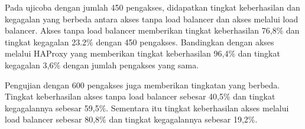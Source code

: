 	Pada ujicoba dengan jumlah 450 pengakses, didapatkan tingkat keberhasilan dan kegagalan yang berbeda antara akses tanpa load balancer dan akses melalui load balancer. Akses tanpa load balancer memberikan tingkat keberhasilan 76,8\% dan tingkat kegagalan 23.2\% dengan 450 pengakses. Bandingkan dengan akses melalui HAProxy yang memberikan tingkat keberhasilan 96,4\% dan tingkat kegagalan 3,6\% dengan jumlah pengakses yang sama.
	
	Pengujian dengan 600 pengakses juga memberikan tingkatan yang berbeda. Tingkat keberhasilan akses tanpa load balancer sebesar 40,5\% dan tingkat kegagalannya sebesar 59,5\%. Sementara itu tingkat keberhasilan akses melalui load balancer sebesar 80,8\% dan tingkat kegagalannya sebesar 19,2\%.


